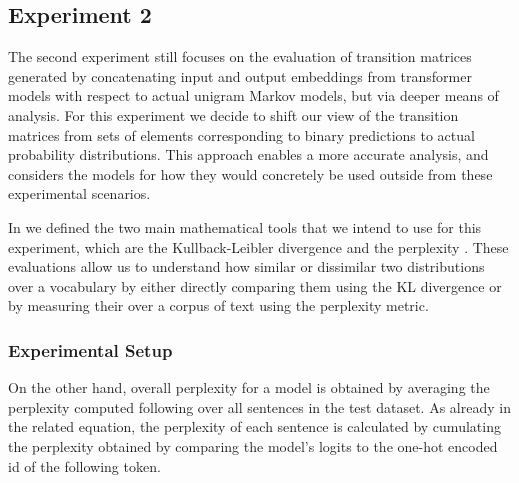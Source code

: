 
\subsection{Experiment 2}

The second experiment still focuses on the evaluation of transition matrices generated by concatenating input and output embeddings from transformer models with respect to actual unigram Markov models, but via deeper means of analysis.
For this experiment we decide to shift our view of the transition matrices from sets of elements corresponding to binary predictions to actual probability distributions.
This approach enables a more accurate analysis, and considers the models for how they would concretely be used outside from these experimental scenarios.

In  we defined the two main mathematical tools that we intend to use for this experiment, which are the Kullback-Leibler divergence  and the perplexity .
These evaluations allow us to understand how similar or dissimilar  two distributions over a vocabulary by either directly comparing them using the KL divergence or by measuring their  over a corpus of text using the perplexity metric. 

\subsubsection{Experimental Setup}


On the other hand, overall perplexity for a model is obtained by averaging the perplexity computed following  over all sentences  in the test dataset.
As already  in the related equation, the perplexity of each sentence is calculated by cumulating  the perplexity obtained by comparing the model's  logits to the one-hot encoded id of the following token.


